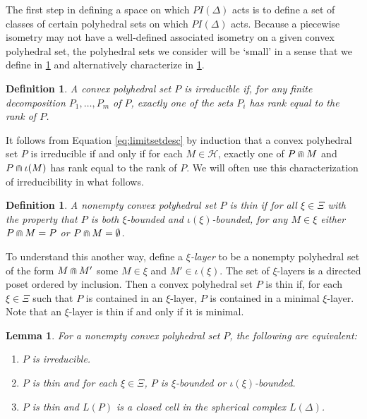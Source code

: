 \documentclass[11pt]{amsart}
\newtheorem{lemma}[theorem]{Lemma}
\newtheorem{definition}[theorem]{Definition}
\numberwithin{table}{section}
\numberwithin{figure}{section}
\theoremstyle{remark}
\begin{document}
The first step in defining a space on which $PI(\Delta)$ acts is to
define a set of classes of certain polyhedral sets on which
$PI(\Delta)$ acts. Because a piecewise isometry may not have a
well-defined associated isometry on a given convex polyhedral set, the
polyhedral sets we consider will be `small' in a sense that we define
in \cref{def:irred} and alternatively characterize in
\cref{lem:irred-form}.

\begin{definition} \label{def:irred} A convex polyhedral set $P$ is
  {\em irreducible} if, for any finite decomposition
  $P_1,\dotsc, P_m$ of $P$, exactly one of the sets
  $P_i$ has rank equal to the rank of $P$.
\end{definition}

It follows from Equation \eqref{eq:limitsetdesc} by induction that a
convex polyhedral set $P$ is irreducible if and only if for each
$M\in \mathcal{H}$, exactly one of $P\doublecap M$ and
$P\doublecap \iota(M)$ has rank equal to the rank of $P$. We will
often use this characterization of irreducibility in what follows.

\begin{definition} \label{def:thin}
  A nonempty convex polyhedral set $P$ is {\em thin} if for all
  $\xi \in \Xi$ with the property that $P$ is both
  $\xi$-bounded and $\iota(\xi)$-bounded, for any $M\in \xi$
  either $P\doublecap M = P$ or $P\doublecap M = \emptyset$.
\end{definition}

To understand this another way, define a {\em $\xi$-layer} to be a
nonempty polyhedral set of the form $M\doublecap M'$ some $M\in
\xi$ and $M'\in \iota(\xi)$. The set of $\xi$-layers is a
directed poset ordered by inclusion. Then a convex polyhedral set $P$
is thin if, for each $\xi \in \Xi$ such that $P$ is contained in
an $\xi$-layer, $P$ is contained in a minimal $\xi$-layer. Note
that an $\xi$-layer is thin if and only if it is minimal.

\begin{lemma} \label{lem:irred-form} For a nonempty convex polyhedral
  set $P$, the following are equivalent:
  \begin{enumerate}
  \item \label{cond-irred} $P$ is irreducible.
  \item \label{cond-bound} $P$ is thin and for each $\xi \in \Xi$, $P$
    is $\xi$-bounded or $\iota(\xi)$-bounded.
  \item $P$ is thin and $L(P)$ is a closed cell in the spherical
    complex $L(\Delta)$.
  \end{enumerate}
\end{lemma}
\end{document}
